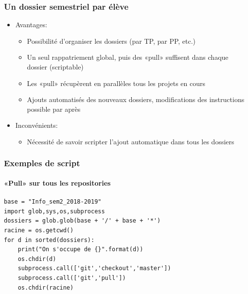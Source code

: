 \begin{frame}
	\frametitle{Un dossier semestriel par élève}

	\begin{itemize}[<+->]
		\item Avantages:
			\begin{itemize}[<+->]
				\item Possibilité d'organiser les dossiers (par TP, par PP, etc.)

				\item Un seul rappatriement global, puis des «pull» suffisent dans chaque dossier (scriptable)

				\item Les «pull» récupèrent en parallèles tous les projets en cours

				\item Ajouts automatisés des nouveaux dossiers, modifications des instructions possible par après
			\end{itemize}
		\item Inconvénients:
			\begin{itemize}[<+->]
				\item Nécessité de savoir scripter l'ajout automatique dans tous les dossiers
			\end{itemize}
	\end{itemize}

\end{frame}


\begin{frame}[fragile]
	\frametitle{Exemples de script}
	\framesubtitle{«Pull» sur tous les repositories}

	\begin{code}
	\begin{verbatim}
base = "Info_sem2_2018-2019"
import glob,sys,os,subprocess
dossiers = glob.glob(base + '/' + base + '*')
racine = os.getcwd()
for d in sorted(dossiers):
    print("On s'occupe de {}".format(d))
    os.chdir(d)
    subprocess.call(['git','checkout','master'])
    subprocess.call(['git','pull'])
    os.chdir(racine)
	\end{verbatim}
	\end{code}
\end{frame}


